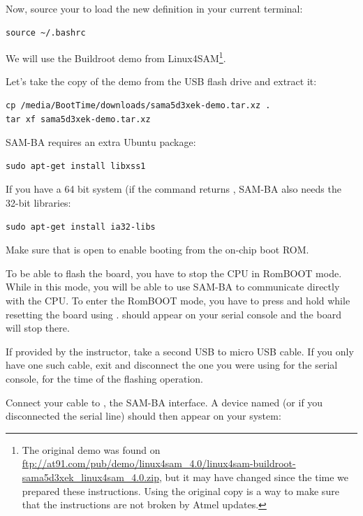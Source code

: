 Now, source your  to load the new definition in your
current terminal:
\begin{verbatim}
source ~/.bashrc
\end{verbatim}

We will use the Buildroot demo from Linux4SAM\footnote{The original demo
was found on
\url{ftp://at91.com/pub/demo/linux4sam_4.0/linux4sam-buildroot-sama5d3xek_linux4sam_4.0.zip},
but it may have changed since the time we prepared these instructions.
Using the original copy is a way to make sure that the instructions are
not broken by Atmel updates.}.

Let's take the copy of the demo from the USB flash drive and extract it:

\begin{verbatim}
cp /media/BootTime/downloads/sama5d3xek-demo.tar.xz .
tar xf sama5d3xek-demo.tar.xz
\end{verbatim}

SAM-BA requires an extra Ubuntu package:

\begin{verbatim}
sudo apt-get install libxss1
\end{verbatim}

If you have a 64 bit system (if the  command returns
, SAM-BA also needs the 32-bit libraries:

\begin{verbatim}
sudo apt-get install ia32-libs
\end{verbatim}

Make sure that  is open to enable booting from the
on-chip boot ROM.

To be able to flash the board, you have to stop the CPU in RomBOOT
mode. While in this mode, you will be able to use SAM-BA to
communicate directly with the CPU. To enter the RomBOOT mode, you have to
press and hold  while resetting the board using .
 should appear on your serial console and the board will
stop there.

If provided by the instructor, take a second USB to micro USB cable.
If you only have one such cable, exit  and disconnect
the one you were using for the serial console, for the time of the
flashing operation.

Connect your cable to , the SAM-BA interface. A device named
 (or  if you disconnected the
serial line) should then appear on your system:

